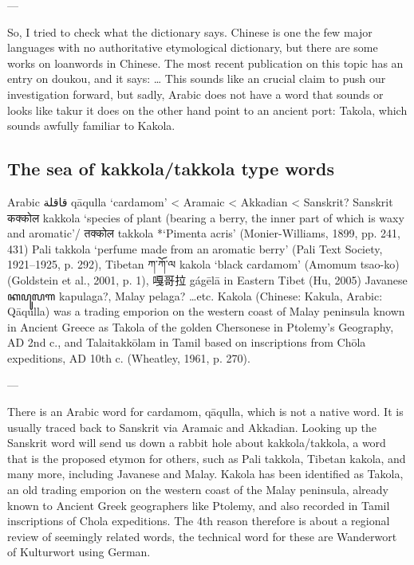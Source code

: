 \documentclass[12pt]{article}
\begin{document}
---

So, I tried to check what the dictionary says. Chinese is one the few major languages with no authoritative etymological dictionary, but there are some works on loanwords in Chinese. The most recent publication on this topic has an entry on doukou, and it says: 
…
This sounds like an crucial claim to push our investigation forward, 
but sadly, Arabic does not have a word that sounds or looks like takur
it does on the other hand point to an ancient port: Takola, which sounds awfully familiar to Kakola.





\subsection{The sea of kakkola/takkola type words}

Arabic قاقلة qāqulla ‘cardamom’ < Aramaic < Akkadian < Sanskrit?
Sanskrit कक्कोल kakkola ‘species of plant (bearing a berry, the inner part of which is waxy and aromatic’/ तक्कोल takkola *‘Pimenta acris’ (Monier-Williams, 1899, pp. 241, 431)
Pali takkola ‘perfume made from an aromatic berry’ (Pali Text Society, 1921–1925, p. 292),
Tibetan ཀ་ཀོ་ལ kakola ‘black cardamom’ (Amomum tsao-ko) (Goldstein et al., 2001, p. 1), 嘎哥拉 gágēlā in Eastern Tibet (Hu, 2005)
Javanese ꦏꦥꦸꦭꦒ kapulaga?, Malay pelaga? …etc.
Kakola (Chinese: Kakula, Arabic: Qāqulla) was a trading emporion on the western coast of Malay peninsula known in Ancient Greece as Takola of the golden Chersonese in Ptolemy’s Geography, AD 2nd c., and Talaitakkōlam in Tamil based on inscriptions from Chōla expeditions, AD 10th c. (Wheatley, 1961, p. 270).

---

There is an Arabic word for cardamom, qāqulla, which is not a native word. It is usually traced back to Sanskrit via Aramaic and Akkadian.
Looking up the Sanskrit word will send us down a rabbit hole about kakkola/takkola, a word that is the proposed etymon for others, such as Pali takkola, Tibetan kakola, and many more, including Javanese and Malay.
Kakola has been identified as Takola, an old trading emporion on the western coast of the Malay peninsula, already known to Ancient Greek geographers like Ptolemy, and also recorded in Tamil inscriptions of Chola expeditions.
The 4th reason therefore is about a regional review of seemingly related words, the technical word for these are Wanderwort of Kulturwort using German. 
\end{document}
